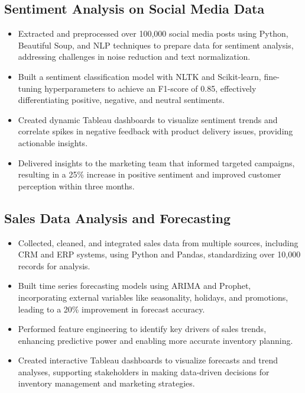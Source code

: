 \documentclass[12pt,a4paper]{article}
\begin{document}
\subsection*{Sentiment Analysis on Social Media Data}
\begin{itemize}[leftmargin=*,noitemsep,topsep=0pt]
\item Extracted and preprocessed over 100,000 social media posts using Python, Beautiful Soup, and NLP techniques to prepare data for sentiment analysis, addressing challenges in noise reduction and text normalization.
\item Built a sentiment classification model with NLTK and Scikit-learn, fine-tuning hyperparameters to achieve an F1-score of 0.85, effectively differentiating positive, negative, and neutral sentiments.
\item Created dynamic Tableau dashboards to visualize sentiment trends and correlate spikes in negative feedback with product delivery issues, providing actionable insights.
\item Delivered insights to the marketing team that informed targeted campaigns, resulting in a 25\% increase in positive sentiment and improved customer perception within three months.
\end{itemize}

\subsection*{Sales Data Analysis and Forecasting}
\begin{itemize}[leftmargin=*,noitemsep,topsep=0pt]
\item Collected, cleaned, and integrated sales data from multiple sources, including CRM and ERP systems, using Python and Pandas, standardizing over 10,000 records for analysis.
\item Built time series forecasting models using ARIMA and Prophet, incorporating external variables like seasonality, holidays, and promotions, leading to a 20\% improvement in forecast accuracy.
\item Performed feature engineering to identify key drivers of sales trends, enhancing predictive power and enabling more accurate inventory planning.
\item Created interactive Tableau dashboards to visualize forecasts and trend analyses, supporting stakeholders in making data-driven decisions for inventory management and marketing strategies.
\end{itemize}
\end{document}
